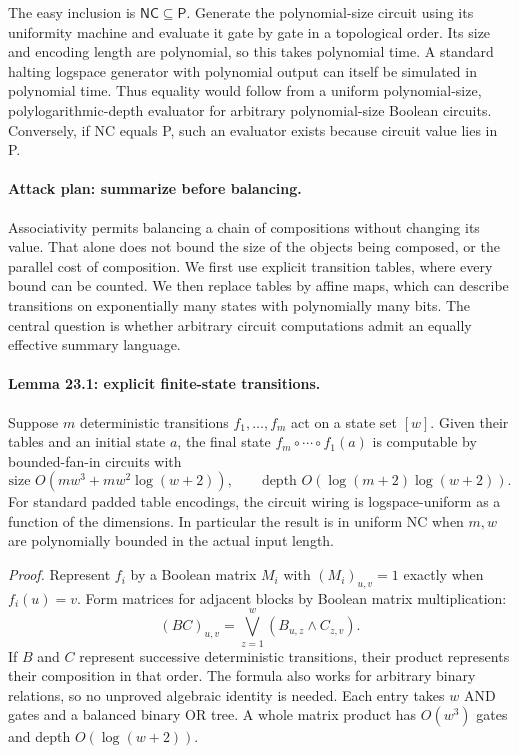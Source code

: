\documentclass[11pt]{article}
\begin{document}
The easy inclusion is $\mathsf{NC}\subseteq\mathsf P$. Generate the
polynomial-size circuit using its uniformity machine and evaluate it gate
by gate in a topological order. Its size and encoding length are polynomial,
so this takes polynomial time. A standard halting logspace generator with
polynomial output can itself be simulated in polynomial time. Thus equality
would follow from a uniform polynomial-size, polylogarithmic-depth evaluator
for arbitrary polynomial-size Boolean circuits. Conversely, if NC equals P,
such an evaluator exists because circuit value lies in P.

\paragraph{Attack plan: summarize before balancing.}
Associativity permits balancing a chain of compositions without changing
its value. That alone does not bound the size of the objects being composed,
or the parallel cost of composition. We first use explicit transition tables,
where every bound can be counted. We then replace tables by affine maps,
which can describe transitions on exponentially many states with polynomially
many bits. The central question is whether arbitrary circuit computations
admit an equally effective summary language.

\paragraph{Lemma 23.1: explicit finite-state transitions.}
Suppose $m$ deterministic transitions $f_1,\ldots,f_m$ act on a state set
$[w]$. Given their tables and an initial state $a$, the final state
$f_m\circ\cdots\circ f_1(a)$ is computable by bounded-fan-in circuits with
\[
 \text{size }O(mw^3+mw^2\log(w+2)),\qquad
 \text{depth }O(\log(m+2)\log(w+2)).
\]
For standard padded table encodings, the circuit wiring is logspace-uniform
as a function of the dimensions. In particular the result is in uniform
NC when $m,w$ are polynomially bounded in the actual input length.

\emph{Proof.} Represent $f_i$ by a Boolean matrix $M_i$ with
$(M_i)_{u,v}=1$ exactly when $f_i(u)=v$. Form matrices for adjacent blocks
by Boolean matrix multiplication:
\[
                (BC)_{u,v}=\bigvee_{z=1}^w(B_{u,z}\wedge C_{z,v}).
\]
If $B$ and $C$ represent successive deterministic transitions, their product
represents their composition in that order. The formula also works for
arbitrary binary relations, so no unproved algebraic identity is needed.
Each entry takes $w$ AND gates and a balanced binary OR tree. A whole
matrix product has $O(w^3)$ gates and depth $O(\log(w+2))$.
\end{document}
